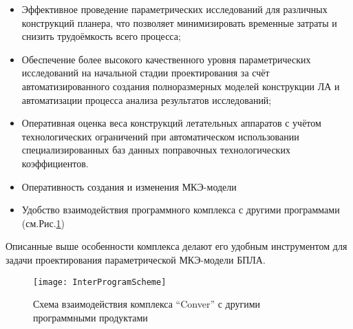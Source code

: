 \begin{itemize}
\item Эффективное проведение параметрических исследований для различных конструкций планера, что позволяет минимизировать временные затраты и снизить трудоёмкость всего процесса;
\item Обеспечение более высокого качественного уровня параметрических исследований на начальной стадии проектирования за счёт автоматизированного создания полноразмерных моделей конструкции ЛА и автоматизации процесса анализа результатов исследований;
\item Оперативная оценка веса конструкций летательных аппаратов с учётом технологических ограничений при автоматическом использовании специализированных баз данных поправочных технологических коэффициентов.
\item Оперативность создания и изменения МКЭ-модели
\item Удобство взаимодействия программного комплекса с другими программами (см.Рис.\ref{fig:InterProgramScheme})
\end{itemize}

Описанные выше особенности комплекса делают его удобным инструментом для задачи проектирования параметрической МКЭ-модели БПЛА. 

\begin{figure}
\centering
\def\svgwidth{0.8\textwidth}
%
\texttt{[image: InterProgramScheme]}
\caption{Схема взаимодействия комплекса ``Conver'' с другими программными продуктами}
\label{fig:InterProgramScheme}
\end{figure}


%